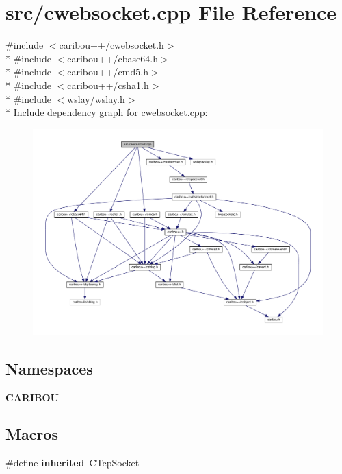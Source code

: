 \section{src/cwebsocket.cpp File Reference}
\label{cwebsocket_8cpp}
{\ttfamily \#include $<$caribou++/cwebsocket.\+h$>$}\\*
{\ttfamily \#include $<$caribou++/cbase64.\+h$>$}\\*
{\ttfamily \#include $<$caribou++/cmd5.\+h$>$}\\*
{\ttfamily \#include $<$caribou++/csha1.\+h$>$}\\*
{\ttfamily \#include $<$wslay/wslay.\+h$>$}\\*
Include dependency graph for cwebsocket.\+cpp\+:
\nopagebreak
\begin{figure}[H]
\begin{center}
\leavevmode
\includegraphics[width=350pt]{cwebsocket_8cpp__incl}
\end{center}
\end{figure}
\subsection*{Namespaces}
\begin{DoxyCompactItemize}
\item 
 {\bf C\+A\+R\+I\+B\+OU}
\end{DoxyCompactItemize}
\subsection*{Macros}
\begin{DoxyCompactItemize}
\item 
\#define {\bf inherited}~C\+Tcp\+Socket
\end{DoxyCompactItemize}


